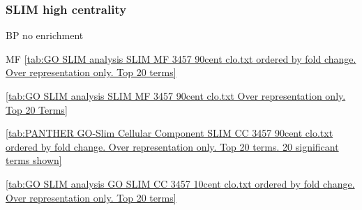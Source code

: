 

\subsubsection{ SLIM high centrality}

BP no enrichment

MF 
\ref{tab:GO SLIM analysis SLIM MF 3457 90cent clo.txt ordered by fold change. Over representation only. Top 20 terms}

\ref{tab:GO SLIM analysis SLIM MF 3457 90cent clo.txt Over representation only. Top 20 Terms}

\ref{tab:PANTHER GO-Slim Cellular Component SLIM CC 3457 90cent clo.txt ordered by fold change. Over representation only. Top 20 terms. 20 significant terms shown}

\ref{tab:GO SLIM analysis GO SLIM CC 3457 10cent clo.txt ordered by fold change. Over representation only. Top 20 terms}




